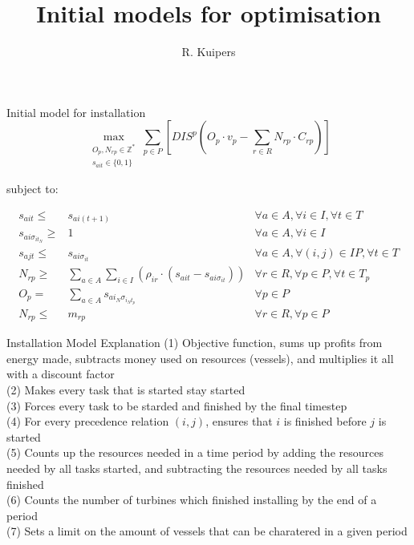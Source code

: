 \documentclass{beamer}
\title[Initial models for optimisation]{Initial models for optimisation}
\author{R. Kuipers}
\begin{document}
\begin{frame}
  \titlepage
\end{frame}


\begin{frame}{Initial model for installation}
\scriptsize
\begin{equation}
	\max_{\substack{O_p, N_{rp} \in \mathbb{Z}^* \\
	s_{ait} \in \{0, 1\}}} 
	\sum_{p \in P} [ DIS^p (O_p \cdot v_p - \sum_{r \in R} N_{rp} \cdot C_{rp}) ]
\end{equation}

\bigskip
subject to:

\begin{align}
s_{ait} \leq& s_{ai(t+1)}											&	\forall a \in A, \forall i \in I, \forall t \in T				\\
s_{ai\sigma_{it_N}} \geq& 1										&	\forall a \in A, \forall i \in I						\\
s_{ajt} \leq& s_{ai\sigma_{it}}										&	\forall a \in A, \forall (i, j) \in IP, \forall t \in T 			\\
N_{rp} \geq& \sum_{a \in A}\sum_{i\in I} (\rho_{ir} \cdot (s_{ait} - s_{ai\sigma_{it}}))		& 	\forall r \in R, \forall p \in P, \forall t \in T_p			\\
O_p =&  \sum_{a \in A} s_{ai_N\sigma_{i_Nt_p}}							& 	\forall p \in P 							\\
N_{rp} \leq& m_{rp}											& 	\forall r \in R, \forall p \in P
\end{align}

\end{frame}

\begin{frame}{Installation Model Explanation}
(1) Objective function, sums up profits from energy made, subtracts money used on resources (vessels), and multiplies it all with a discount factor	\\
(2) Makes every task that is started stay started 	\\
(3) Forces every task to be starded and finished by the final timestep	\\
(4) For every precedence relation $(i, j)$, ensures that $i$ is finished before $j$ is started 	\\
(5) Counts up the resources needed in a time period by adding the resources needed by all tasks started, and subtracting the resources needed by all tasks finished	\\
(6) Counts the number of turbines which finished installing by the end of a period	\\
(7) Sets a limit on the amount of vessels that can be charatered in a given period
\end{frame}
\end{document}
